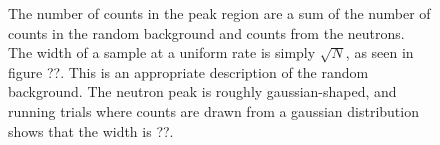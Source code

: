 \begin{figure}[ht]
\centering
  
  

  \caption{The number of counts in the peak region are a sum of the number of counts in the random background and counts from the neutrons.  The width of a sample at a uniform rate is simply $\sqrt{N}$, as seen in figure ??.  This is an appropriate description of the random background.  The neutron peak is roughly gaussian-shaped, and running trials where counts are drawn from a gaussian distribution shows that the width is ??.}
  \label{fig:statDist}
\end{figure}

